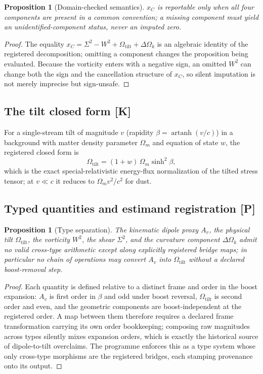 \documentclass[10pt]{article}
\newtheorem{proposition}[theorem]{Proposition}
\theoremstyle{definition}
\newcommand{\tier}[1]{\textbf{[#1]}}
\newcommand{\OmT}{\Omega_{\mathrm{tilt}}}
\newcommand{\dOk}{\Delta\Omega_{k}}
\begin{document}
\begin{proposition}[Domain-checked semantics]
\label{prop:domain}
$x_C$ is reportable only when all four components are present in a
common convention; a missing component must yield an
unidentified-component status, never an imputed zero.
\end{proposition}
\begin{proof}
The equality $x_C = \Sigma^2 - W^2 + \OmT + \dOk$ is an algebraic
identity of the registered decomposition; omitting a component changes
the proposition being evaluated. Because the vorticity enters with a
negative sign, an omitted $W^2$ can change both the sign and the
cancellation structure of $x_C$, so silent imputation is not merely
imprecise but sign-unsafe.
\end{proof}

\subsection{The tilt closed form \tier{K}}

For a single-stream tilt of magnitude $v$ (rapidity
$\beta = \operatorname{artanh}(v/c)$) in a background with matter
density parameter $\Omega_m$ and equation of state $w$, the registered
closed form is
\begin{equation}
\OmT = (1+w)\,\Omega_m \sinh^2\!\beta ,
\label{eq:omtilt}
\end{equation}
which is the exact special-relativistic energy-flux normalization of
the tilted stress tensor; at $v \ll c$ it reduces to
$\Omega_m v^2/c^2$ for dust.

\subsection{Typed quantities and estimand registration \tier{P}}

\begin{proposition}[Type separation]
\label{prop:types}
The kinematic dipole proxy $A_v$, the physical tilt $\OmT$, the
vorticity $W^2$, the shear $\Sigma^2$, and the curvature component
$\dOk$ admit no valid cross-type arithmetic except along explicitly
registered bridge maps; in particular no chain of operations may
convert $A_v$ into $\OmT$ without a declared boost-removal step.
\end{proposition}
\begin{proof}
Each quantity is defined relative to a distinct frame and order in the
boost expansion: $A_v$ is first order in $\beta$ and odd under boost
reversal, $\OmT$ is second order and even, and the geometric components
are boost-independent at the registered order. A map between them
therefore requires a declared frame transformation carrying its own
order bookkeeping; composing raw magnitudes across types silently
mixes expansion orders, which is exactly the historical source of
dipole-to-tilt overclaims. The programme enforces this as a type
system whose only cross-type morphisms are the registered bridges,
each stamping provenance onto its output.
\end{proof}
\end{document}
